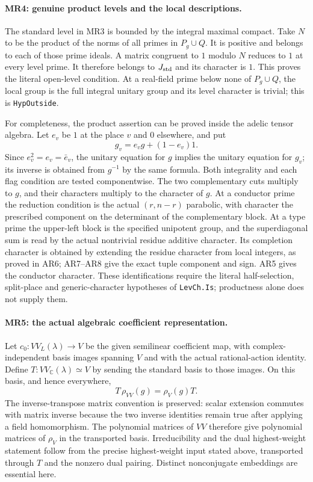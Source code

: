 \paragraph{MR4: genuine product levels and the local descriptions.}
The standard level in MR3 is bounded by the integral maximal compact.
Take $N$ to be the product of the norms of all primes in $P_g\cup Q$.
It is positive and belongs to each of those prime ideals. A matrix
congruent to $1$ modulo $N$ reduces to $1$ at every level prime.
It therefore belongs to $J_{\rm std}$ and its character is $1$.
This proves the literal open-level condition. At a real-field prime
below none of $P_g\cup Q$, the local group is the full integral
unitary group and its level character is trivial; this is
\texttt{HypOutside}.

For completeness, the product assertion can be proved inside the
adelic tensor algebra. Let $e_v$ be $1$ at the place $v$ and $0$
elsewhere, and put
\[
             g_v=e_vg+(1-e_v)1.                      \tag{MR.7}
\]
Since $e_v^2=e_v=\bar e_v$, the unitary equation for $g$ implies
the unitary equation for $g_v$; its inverse is obtained from $g^{-1}$
by the same formula. Both integrality and each flag condition are
tested componentwise. The two complementary cuts multiply to $g$,
and their characters multiply to the character of $g$.
At a conductor prime the reduction condition is the actual
$(r,n-r)$ parabolic, with character the prescribed component on the
determinant of the complementary block. At a type prime the
upper-left block is the specified unipotent group, and the
superdiagonal sum is read by the actual nontrivial residue additive
character. Its completion character is obtained by extending the
residue character from local integers, as proved in AR6; AR7--AR8
give the exact tuple component and sign. AR5 gives the conductor
character. These identifications require the literal half-selection,
split-place and generic-character hypotheses of \texttt{LevCh.Is};
productness alone does not supply them.

\paragraph{MR5: the actual algebraic coefficient representation.}
Let $c_0:VV_L(\lambda)\to V$ be the given semilinear coefficient
map, with complex-independent basis images spanning $V$ and with
the actual rational-action identity. Define
$T:VV_{\mathbb C}(\lambda)\simeq V$ by sending the standard basis
to those images. On this basis, and hence everywhere,
\[
       T\,\rho_{VV}(g)=\rho_V(g)T.                   \tag{MR.8}
\]
The inverse-transpose matrix convention is preserved: scalar
extension commutes with matrix inverse because the two inverse
identities remain true after applying a field homomorphism.
The polynomial matrices of $VV$ therefore give polynomial matrices
of $\rho_V$ in the transported basis. Irreducibility and the dual
highest-weight statement follow from the precise highest-weight
input stated above, transported through $T$ and the nonzero dual
pairing. Distinct nonconjugate embeddings are essential here.

